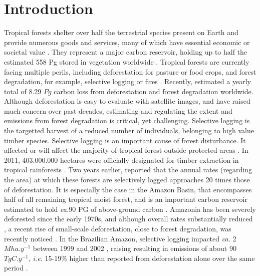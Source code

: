 \documentclass[12pt,]{article}
\let\oldsection\section
\renewcommand\section{\newpage\oldsection}
\theoremstyle{definition}
\theoremstyle{definition}
\theoremstyle{definition}
\theoremstyle{remark}
\begin{document}
\section{Introduction}\label{introduction}

Tropical forests shelter over half the terrestrial species present on
Earth and provide numerous goods and services, many of which have
essential economic or societal value \citep{Foley2007, Myers1997}. They
represent a major carbon reservoir, holding up to half the estimated 558
Pg stored in vegetation worldwide \citep{Houghton2005}. Tropical forests
are currently facing multiple perils, including deforestation for
pasture or food crops, and forest degradation, for example, selective
logging or fires \citep{Houghton2012}. Recently, \citet{Pearson2017}
estimated a yearly total of 8.29 \(Pg\) carbon loss from deforestation
and forest degradation worldwide. Although deforestation is easy to
evaluate with satellite images, and have raised much concern over past
decades, estimating and regulating the extent and emissions from forest
degradation is critical, yet challenging\citep{Herold2011}. Selective
logging is the targetted harvest of a reduced number of individuals,
belonging to high value timber species. Selective logging is an
important cause of forest disturbance. It affected or will affect the
majority of tropical forest outside protected areas \citep{Putz2012}. In
2011, 403.000.000 hectares were officially designated for timber
extraction in tropical rainforests \citep{Blaser2011}. Two years
earlier, \citet{Asner2009} reported that the annual rates (regarding the
area) at which these forests are selectively logged approaches 20 times
those of deforestation. It is especially the case in the Amazon Basin,
that encompasses half of all remaining tropical moist forest, and is an
important carbon reservoir estimated to hold \emph{ca.}90 PG of
above-ground carbon \citep{FAO2010, Saatchi2007, Malhi2006}. Amazonia
has been severely deforested since the early 1970s, and although overall
rates substantially reduced \citep[ \emph{in}
\citet{Rappaport2018}]{INPE2015}, a recent rise of small-scale
deforestation, close to forest degradation, was recently noticed
\citep{Kalamandeen2018}. In the Brazilian Amazon, selective logging
impacted \emph{ca.} 2 \(Mha.y^{−1}\) between 1999 and 2002
\citep{Asner2005}, raising resulting in emissions of about 90
\(TgC.y^{−1}\), \emph{i.e.} 15-19\% higher than reported from
deforestation alone over the same period \citep{Huang2010}.
\end{document}
